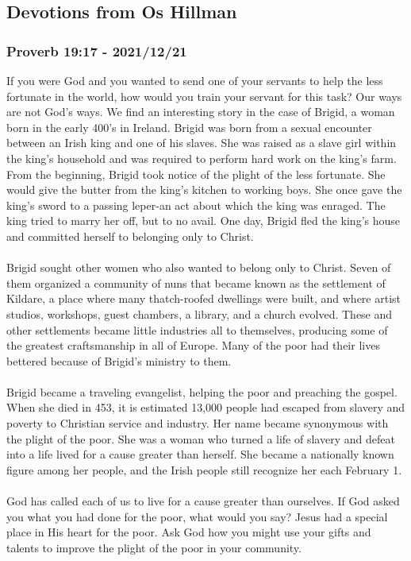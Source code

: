 \subsection{Devotions from Os Hillman}

\subsubsection{Proverb 19:17 - 2021/12/21}



If you were God and you wanted to send one of your servants to help the less fortunate in the world, how would you train your servant for this task? Our ways are not God's ways. We find an interesting story in the case of Brigid, a woman born in the early 400's in Ireland.
Brigid was born from a sexual encounter between an Irish king and one of his slaves. She was raised as a slave girl within the king's household and was required to perform hard work on the king's farm. From the beginning, Brigid took notice of the plight of the less fortunate. She would give the butter from the king's kitchen to working boys. She once gave the king's sword to a passing leper-an act about which the king was enraged. The king tried to marry her off, but to no avail. One day, Brigid fled the king's house and committed herself to belonging only to Christ.\\
\\
\noindent Brigid sought other women who also wanted to belong only to Christ. Seven of them organized a community of nuns that became known as the settlement of Kildare, a place where many thatch-roofed dwellings were built, and where artist studios, workshops, guest chambers, a library, and a church evolved. These and other settlements became little industries all to themselves, producing some of the greatest craftsmanship in all of Europe. Many of the poor had their lives bettered because of Brigid's ministry to them.\\
\\
\noindent Brigid became a traveling evangelist, helping the poor and preaching the gospel. When she died in 453, it is estimated 13,000 people had escaped from slavery and poverty to Christian service and industry. Her name became synonymous with the plight of the poor. She was a woman who turned a life of slavery and defeat into a life lived for a cause greater than herself. She became a nationally known figure among her people, and the Irish people still recognize her each February 1.\\
\\
\noindent God has called each of us to live for a cause greater than ourselves. If God asked you what you had done for the poor, what would you say? Jesus had a special place in His heart for the poor. Ask God how you might use your gifts and talents to improve the plight of the poor in your community.


